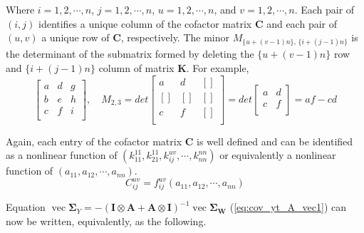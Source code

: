 \documentclass{article}
\begin{document}
Where $i=1,2,\cdots,n$, $j=1,2,\cdots,n$, $u=1,2,\cdots,n$, and $v=1,2,\cdots, n$. Each pair of $(i,j)$ identifies a unique column of the cofactor matrix $\mathbf{C}$  and each pair of $(u,v)$ a unique row of $\mathbf{C}$, respectively. The minor $M_{\{u+(v-1)n\},\,\{i+(j-1)n\}}$ is the determinant of the submatrix formed by deleting the $\{u+(v-1)n\}$ row and $\{i+(j-1)n\}$ column of matrix $\mathbf{K}$. For example,
\begin{equation}
\left[ \begin{array}{ccc}
a & d & g \\
b & e & h \\
c & f & i \\
\end{array} \right],
\quad
M_{2,3}=det
\left[ \begin{array}{ccc}
a & d & {[]} \\
{[]} & {[]} & {[]} \\
c & f & {[]} \\
\end{array} \right]=
det
\left[ \begin{array}{cc}
a & d \\
c & f \\
\end{array} \right]=af-cd
\end{equation}


Again, each entry of the cofactor matrix $\mathbf{C}$ is well defined and can be identified as a nonlinear function of $(k_{11}^{11},k_{21}^{11}, k_{ij}^{uv},\cdots, k_{nn}^{nn})$ or equivalently a nonlinear function of $(a_{11},a_{12},\cdots, a_{nn})$.
\begin{equation}
C_{ij}^{uv}=f_{ij}^{uv}(a_{11},a_{12},\cdots, a_{nn})
\label{eq:cofactor_poly}
\end{equation}

Equation $\operatorname{vec} \mathbf{\Sigma}_Y =- {(\mathbf{I} \otimes \mathbf{A} + \mathbf{A} \otimes \mathbf{I})}^{-1} \operatorname{vec} \mathbf{\Sigma}_\mathbf{W}$ (\ref{eq:cov_yt_A_vec1}) can now be written, equivalently, as the following.
\end{document}
